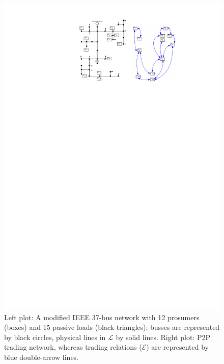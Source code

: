 \documentclass{IEEEtran}  %
\newcommand{\mc}{\mathcal}
\newcommand{\0}{\mathbf{0}}
\newcommand{\1}{\mathbf{1}}
\begin{document}
\begin{figure}
	\centering
	\includegraphics[width=\columnwidth]{figures/NF/37bus_sysIPE1}
	\caption{Left plot: A modified IEEE 37-bus network with 12 prosumers (boxes) and 15 passive loads (black triangles); busses are represented by black circles, physical lines in $\mc L$ by solid lines. Right plot: P2P trading network, whereas trading relations ($\mc E$) are represented by blue double-arrow lines.
	}
	\label{fig:GGp}
\end{figure} 

\end{document}

